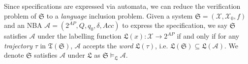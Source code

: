 Since specifications are expressed via automata, we can reduce the verification problem of $\mathfrak{S}$ to a \emph{language} inclusion problem. Given a system $\mathfrak{S} = (\mathcal{X}, \mathcal{X}_0, f)$ and an NBA $\mathcal{A} = (2^{AP}, Q, q_0, \delta, Acc)$ to express the specification, we say $\mathfrak{S}$ satisfies $\mathcal{A}$ under the labelling function $\mathfrak{L}(x): \mathcal{X} \rightarrow 2^{AP}$  if and only if  for any \emph{trajectory} $\tau$ in $\mathfrak{T}(\mathfrak{S})$, $\mathcal{A}$ accepts the \emph{word} $\mathfrak{L}(\tau)$, i.e. $\mathfrak{L}(\mathfrak{S}) \subseteq \mathfrak{L}(\mathcal{A})$. We denote $\mathfrak{S}$ satisfies $\mathcal{A}$ under $\mathfrak{L}$ as $\mathfrak{S} \models_{\mathfrak{L}} \mathcal{A}$.




